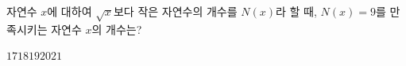 자연수 $x$에 대하여 $\sqrt{x}$보다 작은 자연수의 개수를 $N(x)$라 할 때, $N(x)=9$를 만족시키는 자연수 $x$의 개수는?
\begin{choices32}{$17$}{$18$}{$19$}{$20$}{$21$}\end{choices32}
